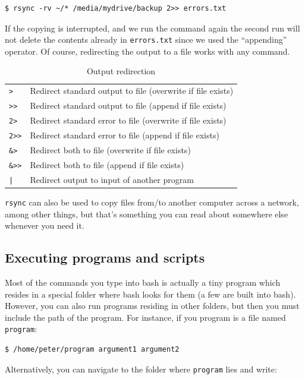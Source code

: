 \begin{verbatim}
$ rsync -rv ~/* /media/mydrive/backup 2>> errors.txt
\end{verbatim}
If the copying is interrupted, and we run the command again the second run will not delete the contents already in \verb|errors.txt| since we used the ``appending'' operator. Of course, redirecting the output to a file works with any command.

\begin{table}
	\centering
	\caption{Output redirection}
	\begin{tabular}{ll}
	\hline
	\verb|>|		& Redirect standard output to file (overwrite if file exists)	\\
	\verb|>>|	& Redirect standard output to file (append if file exists)	\\
	\verb|2>|	& Redirect standard error to file	 (overwrite if file exists)	\\
	\verb|2>>|	& Redirect standard error to file	(append if file exists)	\\
	\verb|&>|	& Redirect both to file (overwrite if file exists) \\
	\verb|&>>|	& Redirect both to file (append if file exists) \\
	\verb$|$		& Redirect output to input of another program \\
	\end{tabular}
	\label{tab:bash:redirection}
\end{table}

\verb|rsync| can also be used to copy files from/to another computer across a network, among other things, but that's something you can read about somewhere else whenever you need it.

\subsection{Executing programs and scripts}
Most of the commands you type into bash is actually a tiny program which resides in a special folder where bash looks for them (a few are built into bash). However, you can also run programs residing in other folders, but then you must include the path of the program. For instance, if you program is a file named \verb|program|:

\begin{verbatim}
$ /home/peter/program argument1 argument2
\end{verbatim}
Alternatively, you can navigate to the folder where \verb|program| lies and write:

